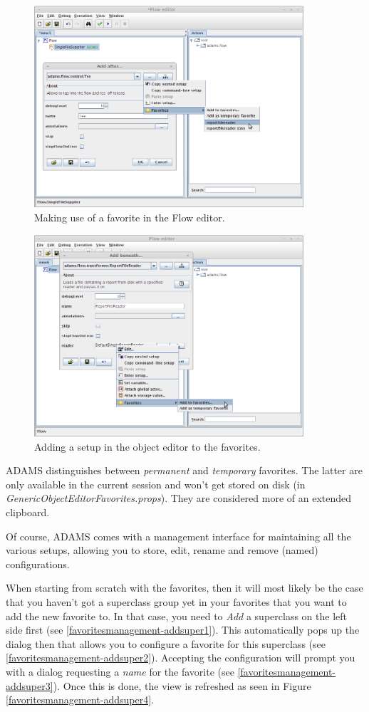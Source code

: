 \begin{figure}[htb]
  \centering
  \includegraphics[width=10.0cm]{images/favorites-floweditor.png}
  \caption{Making use of a favorite in the Flow editor.}
  \label{favorites-floweditor}
\end{figure}

\begin{figure}[htb]
  \centering
  \includegraphics[width=10.0cm]{images/favorites-goe.png}
  \caption{Adding a setup in the object editor to the favorites.}
  \label{favorites-goe}
\end{figure}

ADAMS distinguishes between \textit{permanent} and \textit{temporary} favorites.
The latter are only available in the current session and won't get stored on 
disk (in \textit{GenericObjectEditorFavorites.props}). They are considered 
more of an extended clipboard.

Of course, ADAMS comes with a management interface for maintaining all the
various setups, allowing you to store, edit, rename and remove (named) 
configurations. 

\clearpage
{}
When starting from scratch with the favorites, then it will most likely be the
case that you haven't got a superclass group yet in your favorites that you want
to add the new favorite to. In that case, you need to \textit{Add} a superclass
on the left side first (see \ref{favoritesmanagement-addsuper1}). This
automatically pops up the dialog then that allows you to configure a favorite
for this superclass (see \ref{favoritesmanagement-addsuper2}). Accepting the
configuration will prompt you with a dialog requesting a \textit{name} for the
favorite (see \ref{favoritesmanagement-addsuper3}). Once this is done, the view
is refreshed as seen in Figure \ref{favoritesmanagement-addsuper4}.

